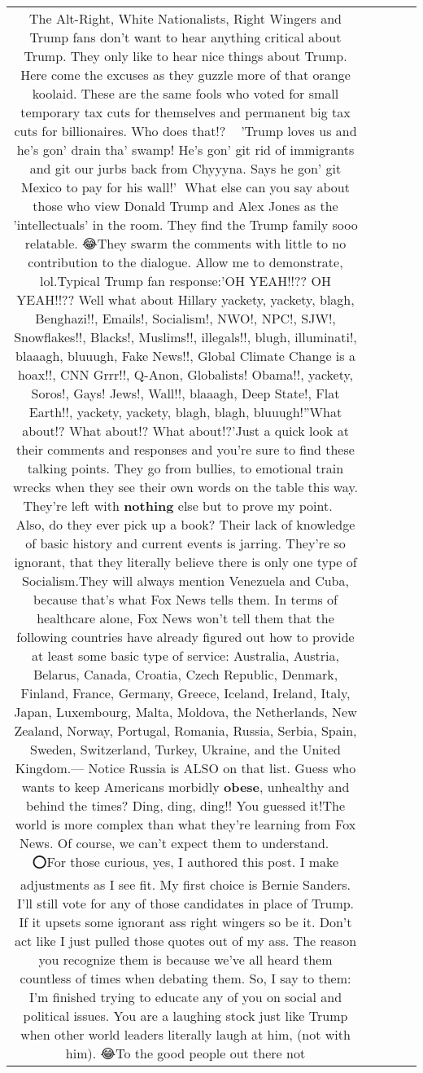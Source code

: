 \documentclass[11pt]{article}
\newlength\mylength
\begin{document}
\begin{center}
\begin{longtable}{|C{.65\mylength}|C{.30\mylength}|C{.12\mylength}|C{.12\mylength}|C{.12\mylength}|}
  \small The Alt-Right, White Nationalists, Right Wingers and Trump fans don't want to hear anything critical about Trump. They only like to hear nice things about Trump. Here come the excuses as they guzzle more of that orange koolaid. These are the same fools who voted for small temporary tax cuts for themselves and permanent big tax cuts for billionaires. Who does that!? 🤦🏻‍♂️'Trump loves us and he's gon' drain tha' swamp! He's gon' git rid of immigrants and git our jurbs back from Chyyyna. Says he gon' git Mexico to pay for his wall!' 🤠What else can you say about those who view Donald Trump and Alex Jones as the 'intellectuals' in the room. They find the Trump family sooo relatable. 😂They swarm the comments with little to no contribution to the dialogue. Allow me to demonstrate, lol.Typical Trump fan response:'OH YEAH!!?? OH YEAH!!?? Well what about Hillary yackety, yackety, blagh, Benghazi!!, Emails!, Socialism!, NWO!, NPC!, SJW!, Snowflakes!!, Blacks!, Muslims!!, illegals!!, blugh, illuminati!, blaaagh, bluuugh, Fake News!!, Global Climate Change is a hoax!!, CNN Grrr!!, Q-Anon, Globalists! Obama!!, yackety, Soros!, Gays! Jews!, Wall!!, blaaagh, Deep State!, Flat Earth!!, yackety, yackety, blagh, blagh, bluuugh!''What about!? What about!? What about!?'Just a quick look at their comments and responses and you're sure to find these talking points. They go from bullies, to emotional train wrecks when they see their own words on the table this way. They're left with \textbf{nothing} else but to prove my point. 🤣🤣🤣 Also, do they ever pick up a book? Their lack of knowledge of basic history and current events is jarring. They're so ignorant, that they literally believe there is only one type of Socialism.They will always mention Venezuela and Cuba, because that's what Fox News tells them. In terms of healthcare alone, Fox News won't tell them that the following countries have already figured out how to provide at least some basic type of service: Australia, Austria, Belarus, Canada, Croatia, Czech Republic, Denmark, Finland, France, Germany, Greece, Iceland, Ireland, Italy, Japan, Luxembourg, Malta, Moldova, the Netherlands, New Zealand, Norway, Portugal, Romania, Russia, Serbia, Spain, Sweden, Switzerland, Turkey, Ukraine, and the United Kingdom.— Notice Russia is ALSO on that list. Guess who wants to keep Americans morbidly \textbf{obese}, unhealthy and behind the times? Ding, ding, ding!! You guessed it!The world is more complex than what they're learning from Fox News. Of course, we can't expect them to understand. 🤦🏻‍♂️😂🤔 ⭕️For those curious, yes, I authored this post. I make adjustments as I see fit. My first choice is Bernie Sanders. I'll still vote for any of those candidates in place of Trump. If it upsets some ignorant ass right wingers so be it. Don't act like I just pulled those quotes out of my ass. The reason you recognize them is because we've all heard them countless of times when debating them.  So, I say to them: I'm finished trying to educate any of you on social and political issues. You are a laughing stock just like Trump when other world leaders literally laugh at him, (not with him). 😂To the good people out there not 
\end{longtable}
\end{center}
\end{document}
